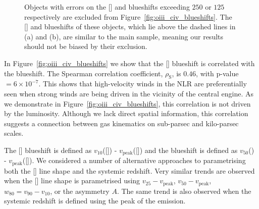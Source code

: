 \begin{figure}
\captionsetup[subfigure]{labelformat=empty}
\centering 
    \subfloat[\label{fig:oiii_civ_blueshifts_a}]{}
    \subfloat[\label{fig:oiii_civ_blueshifts_b}]{}
    \caption[{Objects excluded from in Figure~\ref{fig:oiii_civ_blueshifts}.}]{Objects with errors on the [] and  blueshifts exceeding $250$ or $125$\,\kms\, respectively are excluded from Figure~\ref{fig:oiii_civ_blueshifts}. The [] and  blueshifts of these objects, which lie above the dashed lines in (a) and (b), are similar to the main sample, meaning our results should not be biased by their exclusion.}
    \label{fig:oiii_civ_blueshifts_flagged}
\end{figure}

In Figure~\ref{fig:oiii_civ_blueshifts} we show that the [] blueshift is correlated with the  blueshift.
The Spearman correlation coefficient, $\rho_{\text{S}}$, is $0.46$, with p-value $=6\times10^{-7}$. 
This shows that high-velocity winds in the NLR are preferentially seen when strong winds are being driven in the vicinity of the central engine. 
As we demonstrate in Figure~\ref{fig:oiii_civ_blueshifts}, this correlation is not driven by the luminosity. 
Although we lack direct spatial information, this correlation suggests a connection between gas kinematics on sub-parsec and kilo-parsec scales. 

The [] blueshift is defined as $v_{10}$([]) - $v_{\text{peak}}$([]) and the  blueshift is defined as $v_{50}$() - $v_{\text{peak}}$([]).
We considered a number of alternative approaches to parametrising both the [] line shape and the systemic redshift. 
Very similar trends are observed when the [] line shape is parametrised using $v_{25} - v_{\text{peak}}$, $v_{50} - v_{\text{peak}}$, $w_{80} = v_{90} - v_{10}$, or the asymmetry $A$.
The same trend is also observed when the systemic redshift is defined using the peak of the \hb emission. 

